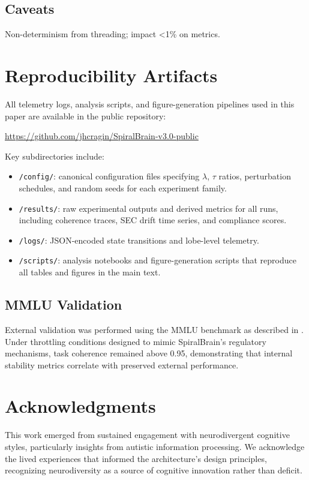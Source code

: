 \documentclass[11pt,a4paper]{article}
\begin{document}
\subsection{Caveats}
Non-determinism from threading; impact <1\% on metrics.

\section{Reproducibility Artifacts}

All telemetry logs, analysis scripts, and figure-generation pipelines used in this paper
are available in the public repository:

\url{https://github.com/jhcragin/SpiralBrain-v3.0-public}

Key subdirectories include:

\begin{itemize}
  \item \texttt{/config/}: canonical configuration files specifying $\lambda$, $\tau$ ratios,
        perturbation schedules, and random seeds for each experiment family.
  \item \texttt{/results/}: raw experimental outputs and derived metrics for all runs,
        including coherence traces, SEC drift time series, and compliance scores.
  \item \texttt{/logs/}: JSON-encoded state transitions and lobe-level telemetry.
  \item \texttt{/scripts/}: analysis notebooks and figure-generation scripts that
        reproduce all tables and figures in the main text.
\end{itemize}

\subsection{MMLU Validation}

External validation was performed using the MMLU benchmark as described in \cite{mmlu_cognitive_integrity}. Under throttling conditions designed to mimic SpiralBrain's regulatory mechanisms, task coherence remained above 0.95, demonstrating that internal stability metrics correlate with preserved external performance.

\section*{Acknowledgments}

This work emerged from sustained engagement with neurodivergent cognitive styles, particularly insights from autistic information processing. We acknowledge the lived experiences that informed the architecture's design principles, recognizing neurodiversity as a source of cognitive innovation rather than deficit.
\end{document}
